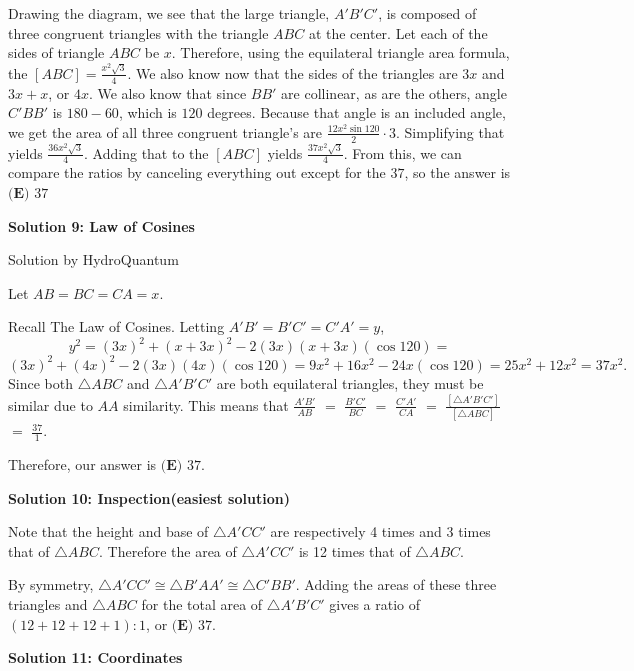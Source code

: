 \begin{enumerate}
Drawing the diagram, we see that the large triangle, $A'B'C'$, is composed of three congruent triangles with the triangle $ABC$ at the center. Let each of the sides of triangle $ABC$ be $x$. Therefore, using the equilateral triangle area formula, the $[ABC] = \frac{x^2\sqrt{3}}{4}$. We also know now that the sides of the triangles are $3x$ and $3x + x$, or $4x$. We also know that since $BB'$ are collinear, as are the others, angle $C'BB'$ is $180 - 60$, which is $120$ degrees. Because that angle is an included angle, we get the area of all three congruent triangle's are $\frac{12x^2\sin120}{2} \cdot 3$. Simplifying that yields $\frac{36x^2\sqrt{3}}{4}$. Adding that to the $[ABC]$ yields $\frac{37x^2\sqrt{3}}{4}$. From this, we can compare the ratios by canceling everything out except for the $37$, so the answer is $\boxed{\textbf{(E) }37}$




\textbf{Solution 9: Law of Cosines}

Solution by HydroQuantum

 
Let $AB=BC=CA=x$.

 
Recall The Law of Cosines. Letting $A'B'=B'C'=C'A'=y$, 
 \[y^2=(3x)^2+(x+3x)^2-2(3x)(x+3x)(\cos 120) =\] 
 \[(3x)^2+(4x)^2-2(3x)(4x)(\cos 120)=9x^2+16x^2-24x(\cos 120)=25x^2+12x^2=37x^2.\] Since both $\triangle ABC$ and $\triangle A'B'C'$ are both equilateral triangles, they must be similar due to $AA$ similarity. This means that $\frac{A'B'}{AB}$ $=$ $\frac{B'C'}{BC}$ $=$ $\frac{C'A'}{CA}$ $=$ $\frac{[\triangle A'B'C']}{[\triangle ABC]}$ $=$ $\frac{37}{1}$.

 
Therefore, our answer is $\boxed{\textbf{(E) }37}$.

 



\textbf{Solution 10: Inspection(easiest solution)}

Note that the height and base of $\triangle A'CC'$ are respectively 4 times and 3 times that of $\triangle ABC$. Therefore the area of $\triangle A'CC'$ is 12 times that of $\triangle ABC$.

 By symmetry, $\triangle A'CC' \cong \triangle B'AA' \cong \triangle C'BB'$. Adding the areas of these three triangles and $\triangle ABC$ for the total area of $\triangle A'B'C'$ gives a ratio of $(12 + 12 + 12 + 1) : 1$, or $\boxed{\textbf{(E) } 37}$.

 



\textbf{Solution 11: Coordinates}


\end{enumerate}
